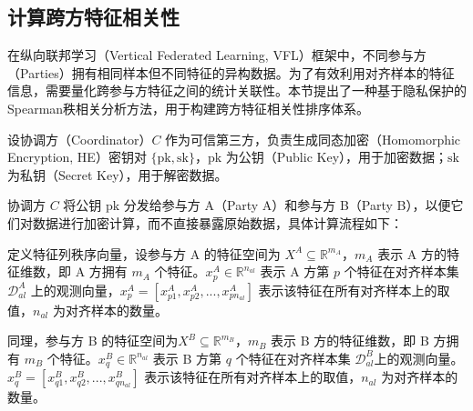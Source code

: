 \subsection{计算跨方特征相关性}
在纵向联邦学习（Vertical Federated Learning, VFL）框架中，不同参与方（Parties）拥有相同样本但不同特征的异构数据。为了有效利用对齐样本的特征信息，需要量化跨参与方特征之间的统计关联性。本节提出了一种基于隐私保护的Spearman秩相关分析方法，用于构建跨方特征相关性排序体系。

设协调方（Coordinator）$ C $ 作为可信第三方，负责生成同态加密（Homomorphic Encryption, HE）密钥对 $ \{\text{pk}, \text{sk}\} $，$ \text{pk} $ 为公钥（Public Key），用于加密数据；$ \text{sk} $ 为私钥（Secret Key），用于解密数据。

协调方 $ C $ 将公钥 $ \text{pk} $ 分发给参与方 A（Party A）和参与方 B（Party B），以便它们对数据进行加密计算，而不直接暴露原始数据，具体计算流程如下：

定义特征列秩序向量，设参与方 A 的特征空间为 $X^A \subseteq \mathbb{R}^{m_A}$，$ m_A $ 表示 A 方的特征维数，即 A 方拥有 $ m_A $ 个特征。$ x^A_p \in \mathbb{R}^{n_{al}} $ 表示 A 方第 $ p $ 个特征在对齐样本集 $ \mathcal{D}^A_{al} $ 上的观测向量，$ x^A_p = [x^A_{p1}, x^A_{p2}, ..., x^A_{pn_{al}}] $ 表示该特征在所有对齐样本上的取值，$ n_{al} $ 为对齐样本的数量。

同理，参与方 B 的特征空间为$X^B \subseteq \mathbb{R}^{m_B}$，$ m_B $ 表示 B 方的特征维数，即 B 方拥有 $ m_B $ 个特征。$ x^B_q \in \mathbb{R}^{n_{al}} $ 表示 B 方第 $ q $ 个特征在对齐样本集 $ \mathcal{D}^B_{al} $上的观测向量。$ x^B_q = [x^B_{q1}, x^B_{q2}, ..., x^B_{qn_{al}}] $ 表示该特征在所有对齐样本上的取值，$ n_{al} $ 为对齐样本的数量。

